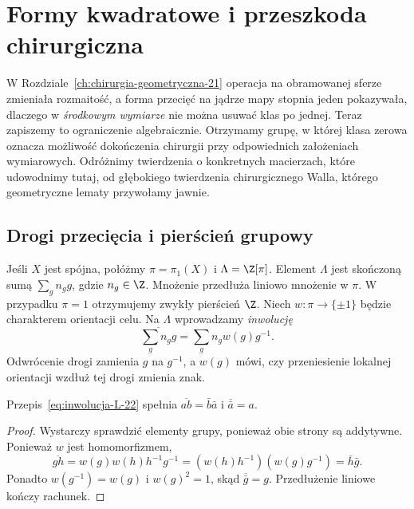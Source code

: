\chapter{Formy kwadratowe i przeszkoda chirurgiczna}
\label{ch:przeszkoda-chirurgiczna}

W Rozdziale~\ref{ch:chirurgia-geometryczna-21} operacja na
obramowanej sferze zmieniała rozmaitość, a forma przecięć
na jądrze mapy stopnia jeden pokazywała, dlaczego w
\emph{środkowym wymiarze} nie można usuwać klas po jednej.
Teraz zapiszemy to ograniczenie algebraicznie. Otrzymamy
grupę, w której klasa zerowa oznacza możliwość dokończenia
chirurgii przy odpowiednich założeniach wymiarowych.
Odróżnimy twierdzenia o konkretnych macierzach, które
udowodnimy tutaj, od głębokiego twierdzenia chirurgicznego
Walla, którego geometryczne lematy przywołamy jawnie.

\section{Drogi przecięcia i pierścień grupowy}
\label{sec:pi-formy-22}

Jeśli $X$ jest spójna, połóżmy $\pi=\pi_1(X)$ i
$\Lambda=\Z[\pi]$. Element $\Lambda$ jest skończoną
sumą $\sum_g n_g g$, gdzie $n_g\in\Z$. Mnożenie
przedłuża liniowo mnożenie w $\pi$. W przypadku
$\pi=1$ otrzymujemy zwykły pierścień $\Z$.
Niech $w:\pi\to\{\pm1\}$ będzie charakterem
orientacji celu. Na $\Lambda$ wprowadzamy \emph{inwolucję}
\begin{equation}\label{eq:inwolucja-L-22}
 \overline{\sum_g n_g g}
     =\sum_g n_g w(g)g^{-1}.
\end{equation}
Odwrócenie drogi zamienia $g$ na $g^{-1}$, a
$w(g)$ mówi, czy przeniesienie lokalnej orientacji
wzdłuż tej drogi zmienia znak.

\begin{stwierdzenie}
\label{prop:inwolucja-L-22}
Przepis~\eqref{eq:inwolucja-L-22} spełnia
$\overline{ab}=\bar b\bar a$ i
$\overline{\bar a}=a$.
\end{stwierdzenie}
\begin{proof}
Wystarczy sprawdzić elementy grupy, ponieważ obie
strony są addytywne. Ponieważ $w$ jest homomorfizmem,
\[
 \overline{gh}=w(g)w(h)h^{-1}g^{-1}
              =(w(h)h^{-1})(w(g)g^{-1})
              =\bar h\bar g.
\]
Ponadto $w(g^{-1})=w(g)$ i $w(g)^2=1$, skąd
$\overline{\bar g}=g$. Przedłużenie liniowe kończy
rachunek.
\end{proof}

